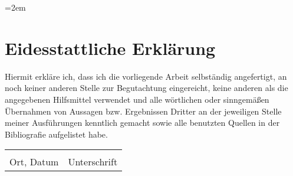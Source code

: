 \documentclass[10pt,a4paper,twoside,notitlepage]{report}
\begin{document}
\emergencystretch=2em
\printbibliography

\newpage
\pagestyle{plain}
\section*{Eidesstattliche Erklärung}

\vspace{2cm}
Hiermit erkläre ich, dass ich die vorliegende Arbeit selbständig angefertigt, an
noch keiner anderen Stelle zur Begutachtung eingereicht, keine anderen als   die
angegebenen   Hilfsmittel   verwendet   und   alle   wörtlichen   oder
sinngemäßen Übernahmen von Aussagen bzw. Ergebnissen Dritter an der jeweiligen
Stelle   meiner   Ausführungen   kenntlich   gemacht   sowie   alle   benutzten
Quellen in der Bibliografie aufgelistet habe. 
\mbox{}
\vfill
\noindent
\begin{tabular}{@{}p{2.5in}p{2.5in}@{}}
  \hrulefill & \hrulefill \\
  Ort, Datum & Unterschrift
\end{tabular}
\end{document}

